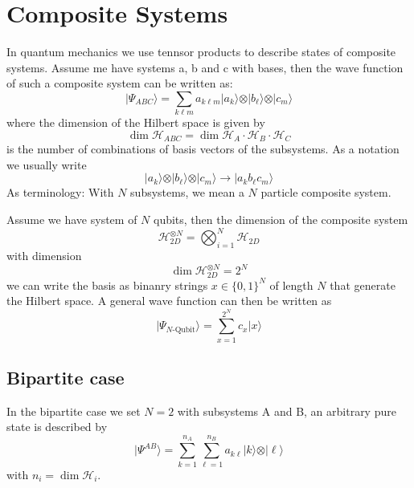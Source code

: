 \documentclass[12pt]{book}
\theoremstyle{definition}
\let\oldsum\sum
\renewcommand{\sum}[2]{\oldsum\limits_{#1}^{#2}}
\renewcommand{\to}{\longrightarrow}
\newcommand{\ket}[1]{\vert {#1} \rangle}
\begin{document}
\section{Composite Systems}
In quantum mechanics we use tennsor products to describe states of composite systems. Assume me have systems a, b and c with bases, then the wave function of such a composite system can be written as:
\begin{equation}
  \ket{\Psi_{ABC}} = \oldsum_{k\ell m} a_{k\ell m} \ket{a_k} \otimes \ket{b_\ell} \otimes \ket{c_m}
\end{equation}
where the dimension of the Hilbert space is given by
\begin{equation}
  \dim \mathcal H_{ABC} = \dim \mathcal H_A \cdot \mathcal H_B \cdot \mathcal H_C
\end{equation}
is the number of combinations of basis vectors of the subsystems. As a notation we usually write
\begin{equation}
  \ket{a_k} \otimes \ket{b_\ell} \otimes \ket{c_m} \to \ket{a_k b_\ell c_m}
\end{equation}
As terminology: With $N$ subsystems, we mean a $N$ particle composite system.

Assume we have system of $N$ qubits, then the dimension of the composite system
\begin{equation*}
  \mathcal H_{2D}^{\otimes N} = \bigotimes_{i=1}^{N} \mathcal H_{2D}
\end{equation*}
with dimension
\begin{equation}
  \dim \mathcal H_{2D}^{\otimes N} = 2^N
\end{equation}
we can write the basis as binanry strings $x \in \{0, 1\}^N$ of length $N$ that generate the Hilbert space. A general wave function can then be written as
\begin{equation}
  \ket{\Psi_{N\textrm{-Qubit}}} = \sum{x=1}{2^N} c_x \ket{x}
\end{equation}


\subsection{Bipartite case}
In the bipartite case we set $N=2$ with subsystems A and B, an arbitrary pure state is described by
\begin{equation}
  \ket{\Psi^{AB}} = \sum{k=1}{n_A} \sum{\ell = 1}{n_B} a_{k\ell} \ket{k} \otimes \ket{\ell}
\end{equation}
with $n_i = \dim \mathcal H_i$.
\end{document}

